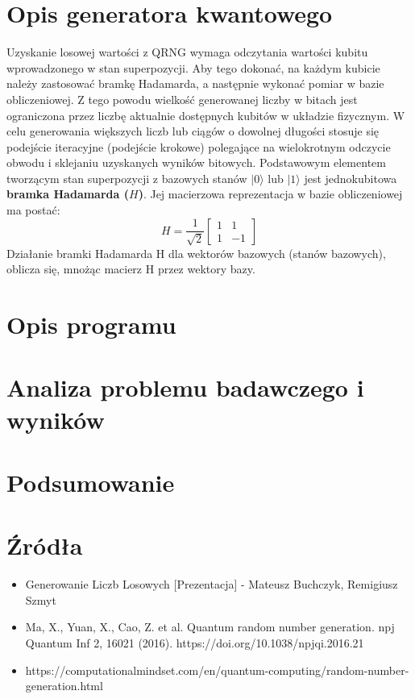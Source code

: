 \documentclass{article}
\begin{document}
\section{Opis generatora kwantowego}
Uzyskanie losowej wartości z QRNG wymaga odczytania wartości kubitu wprowadzonego w stan superpozycji. Aby tego dokonać, na każdym kubicie należy zastosować bramkę Hadamarda, a następnie wykonać pomiar w bazie obliczeniowej. Z tego powodu wielkość generowanej liczby w bitach jest ograniczona przez liczbę aktualnie dostępnych kubitów w układzie fizycznym. W celu generowania większych liczb lub ciągów o dowolnej długości stosuje się podejście iteracyjne (podejście krokowe) polegające na wielokrotnym odczycie obwodu i sklejaniu uzyskanych wyników bitowych.
Podstawowym elementem tworzącym stan superpozycji z bazowych stanów $|0\rangle$ lub $|1\rangle$ jest jednokubitowa \textbf{bramka Hadamarda ($H$)}. Jej macierzowa reprezentacja w bazie obliczeniowej ma postać:
$$H = \frac{1}{\sqrt{2}} \begin{bmatrix} 1 & 1 \\ 1 & -1 \end{bmatrix}$$
Działanie bramki Hadamarda H dla wektorów bazowych (stanów bazowych), oblicza się, mnożąc macierz H przez wektory bazy.
\section{Opis programu}
\section{Analiza problemu badawczego i wyników}
\section{Podsumowanie}
\section{Źródła}
\begin{itemize}
    \item Generowanie Liczb Losowych [Prezentacja] - Mateusz Buchczyk, Remigiusz Szmyt
    \item Ma, X., Yuan, X., Cao, Z. et al. Quantum random number generation. npj Quantum Inf 2, 16021 (2016). https://doi.org/10.1038/npjqi.2016.21
    \item https://computationalmindset.com/en/quantum-computing/random-number-generation.html
\end{itemize}
\end{document}
